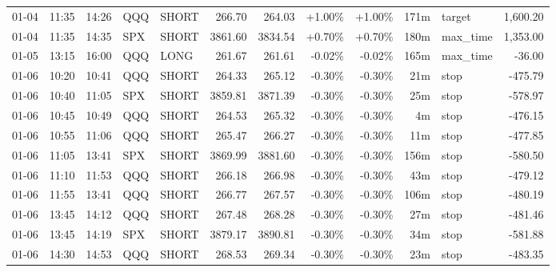 \documentclass[11pt,a4paper]{article}
\begin{document}
\begin{center}
\begin{longtable}{>{\color{txtmain}}l l l l l r r r r r >{\color{txtmain}}l r}
01-04 & 11:35 & 14:26 & QQQ & SHORT & 266.70 & 264.03 & \textcolor{wingreen}{+1.00\%} & \textcolor{wingreen}{+1.00\%} & 171m & target & \textcolor{wingreen}{1,600.20} \\
01-04 & 11:35 & 14:35 & SPX & SHORT & 3861.60 & 3834.54 & \textcolor{wingreen}{+0.70\%} & \textcolor{wingreen}{+0.70\%} & 180m & max\_time & \textcolor{wingreen}{1,353.00} \\
01-05 & 13:15 & 16:00 & QQQ & LONG & 261.67 & 261.61 & \textcolor{lossred}{-0.02\%} & \textcolor{lossred}{-0.02\%} & 165m & max\_time & \textcolor{lossred}{-36.00} \\
01-06 & 10:20 & 10:41 & QQQ & SHORT & 264.33 & 265.12 & \textcolor{lossred}{-0.30\%} & \textcolor{lossred}{-0.30\%} & 21m & stop & \textcolor{lossred}{-475.79} \\
01-06 & 10:40 & 11:05 & SPX & SHORT & 3859.81 & 3871.39 & \textcolor{lossred}{-0.30\%} & \textcolor{lossred}{-0.30\%} & 25m & stop & \textcolor{lossred}{-578.97} \\
01-06 & 10:45 & 10:49 & QQQ & SHORT & 264.53 & 265.32 & \textcolor{lossred}{-0.30\%} & \textcolor{lossred}{-0.30\%} & 4m & stop & \textcolor{lossred}{-476.15} \\
01-06 & 10:55 & 11:06 & QQQ & SHORT & 265.47 & 266.27 & \textcolor{lossred}{-0.30\%} & \textcolor{lossred}{-0.30\%} & 11m & stop & \textcolor{lossred}{-477.85} \\
01-06 & 11:05 & 13:41 & SPX & SHORT & 3869.99 & 3881.60 & \textcolor{lossred}{-0.30\%} & \textcolor{lossred}{-0.30\%} & 156m & stop & \textcolor{lossred}{-580.50} \\
01-06 & 11:10 & 11:53 & QQQ & SHORT & 266.18 & 266.98 & \textcolor{lossred}{-0.30\%} & \textcolor{lossred}{-0.30\%} & 43m & stop & \textcolor{lossred}{-479.12} \\
01-06 & 11:55 & 13:41 & QQQ & SHORT & 266.77 & 267.57 & \textcolor{lossred}{-0.30\%} & \textcolor{lossred}{-0.30\%} & 106m & stop & \textcolor{lossred}{-480.19} \\
01-06 & 13:45 & 14:12 & QQQ & SHORT & 267.48 & 268.28 & \textcolor{lossred}{-0.30\%} & \textcolor{lossred}{-0.30\%} & 27m & stop & \textcolor{lossred}{-481.46} \\
01-06 & 13:45 & 14:19 & SPX & SHORT & 3879.17 & 3890.81 & \textcolor{lossred}{-0.30\%} & \textcolor{lossred}{-0.30\%} & 34m & stop & \textcolor{lossred}{-581.88} \\
01-06 & 14:30 & 14:53 & QQQ & SHORT & 268.53 & 269.34 & \textcolor{lossred}{-0.30\%} & \textcolor{lossred}{-0.30\%} & 23m & stop & \textcolor{lossred}{-483.35} \\

\end{longtable}
\end{center}
\end{document}

